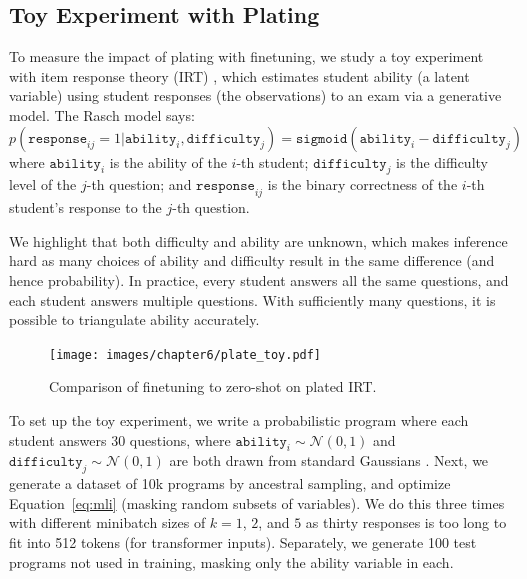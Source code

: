 \subsection{Toy Experiment with Plating}
\label{sec:app:irt}

To measure the impact of plating with finetuning, we study a toy experiment with item response theory (IRT) \cite{edgeworth1888statistics,hambleton1991fundamentals,rasch1993probabilistic,wu2020variational,wu2021modeling}, which estimates student ability (a latent variable) using student responses (the observations) to an exam via a generative model. The Rasch model \cite{rasch1993probabilistic} says:
\begin{equation}
  p(\texttt{response}_{ij} = 1 | \texttt{ability}_i, \texttt{difficulty}_j) = \texttt{sigmoid}(\texttt{ability}_i - \texttt{difficulty}_j)
  \label{eq:irt}
\end{equation}
where $\texttt{ability}_i$ is the ability of the $i$-th student; $\texttt{difficulty}_j$ is the difficulty level of the $j$-th question; and $\texttt{response}_{ij}$ is the binary correctness of the $i$-th student's response to the $j$-th question.

We highlight that both difficulty and ability are unknown, which makes inference hard as many choices of ability and difficulty result in the same difference (and hence probability). In practice, every student answers all the same questions, and each student answers multiple questions. With sufficiently many questions, it is possible to triangulate ability accurately.

\begin{figure}[h!]
  \begin{center}
    \texttt{[image: images/chapter6/plate\_toy.pdf]}
  \end{center}
  \caption{Comparison of finetuning to zero-shot on plated IRT.}
  \label{fig:platetoy}
\end{figure}

To set up the toy experiment, we write a probabilistic program where each student answers 30 questions, where $\texttt{ability}_i \sim \mathcal{N}(0, 1)$ and $\texttt{difficulty}_j \sim \mathcal{N}(0, 1)$ are both drawn from standard Gaussians \cite{rasch1993probabilistic}. Next, we generate a dataset of 10k programs by ancestral sampling, and optimize Equation~\ref{eq:mli} (masking random subsets of variables). We do this three times with different minibatch sizes of $k=1$, $2$, and $5$ as thirty responses is too long to fit into 512 tokens (for transformer inputs). Separately, we generate 100 test programs not used in training, masking only the ability variable in each.

